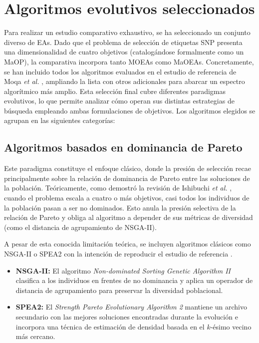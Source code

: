 \section{Algoritmos evolutivos seleccionados}

Para realizar un estudio comparativo exhaustivo, se ha seleccionado un conjunto diverso de EAs. Dado que el problema de selección de etiquetas SNP presenta una dimensionalidad de cuatro objetivos (catalogándose formalmente como un MaOP), la comparativa incorpora tanto MOEAs como MaOEAs. Concretamente, se han incluido todos los algoritmos evaluados en el estudio de referencia de Moqa \textit{et al.} \cite{moqa2022assessing}, ampliando la lista con otros adicionales para abarcar un espectro algorítmico más amplio. Esta selección final cubre diferentes paradigmas evolutivos, lo que permite analizar cómo operan sus distintas estrategias de búsqueda empleando ambas formulaciones de objetivos. Los algoritmos elegidos se agrupan en las siguientes categorías:

\subsection{Algoritmos basados en dominancia de Pareto}
Este paradigma constituye el enfoque clásico, donde la presión de selección recae principalmente sobre la relación de dominancia de Pareto entre las soluciones de la población. Teóricamente, como demostró la revisión de Ishibuchi \textit{et al.} \cite{ishibuchi2008evolutionary}, cuando el problema escala a cuatro o más objetivos, casi todos los individuos de la población pasan a ser no dominados. Esto anula la presión selectiva de la relación de Pareto y obliga al algoritmo a depender de sus métricas de diversidad (como el distancia de agrupamiento de NSGA-II). 

A pesar de esta conocida limitación teórica, se incluyen algoritmos clásicos como NSGA-II o SPEA2 con la intención de reproducir el estudio de referencia \cite{moqa2022assessing}.
\begin{itemize}
    \item \textbf{NSGA-II:} El algoritmo \textit{Non-dominated Sorting Genetic Algorithm II} \cite{deb2002fast} clasifica a los individuos en frentes de no dominancia y aplica un operador de distancia de agrupamiento para preservar la diversidad poblacional.
    \item \textbf{SPEA2:} El \textit{Strength Pareto Evolutionary Algorithm 2} \cite{zitzler2001spea2} mantiene un archivo secundario con las mejores soluciones encontradas durante la evolución e incorpora una técnica de estimación de densidad basada en el $k$-ésimo vecino más cercano.
\end{itemize}

